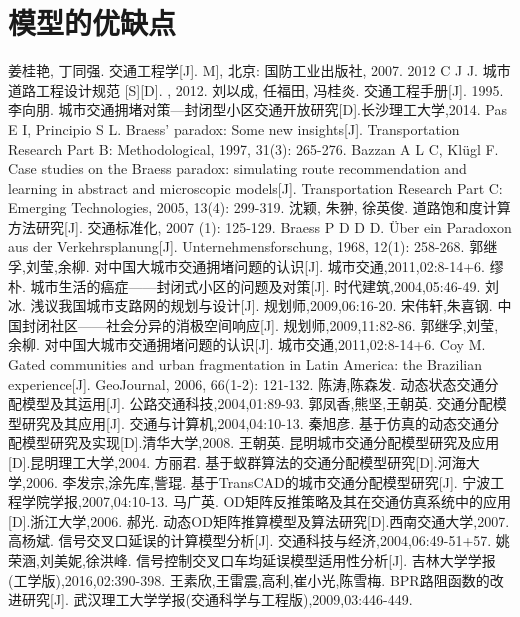 \documentclass{xcumcmart}
\begin{document}
\section{模型的优缺点}

\begin{thebibliography}{1}
 姜桂艳, 丁同强. 交通工程学[J]. M], 北京: 国防工业出版社, 2007.
 2012 C J J. 城市道路工程设计规范 [S][D]. , 2012.
 刘以成, 任福田, 冯桂炎. 交通工程手册[J]. 1995.
 李向朋. 城市交通拥堵对策—封闭型小区交通开放研究[D].长沙理工大学,2014.
Pas E I, Principio S L. Braess' paradox: Some new insights[J]. Transportation Research Part B: Methodological, 1997, 31(3): 265-276.
Bazzan A L C, Klügl F. Case studies on the Braess paradox: simulating route recommendation and learning in abstract and microscopic models[J]. Transportation Research Part C: Emerging Technologies, 2005, 13(4): 299-319.
 沈颖, 朱翀, 徐英俊. 道路饱和度计算方法研究[J]. 交通标准化, 2007 (1): 125-129.
 Braess P D D D. Über ein Paradoxon aus der Verkehrsplanung[J]. Unternehmensforschung, 1968, 12(1): 258-268.
郭继孚,刘莹,余柳. 对中国大城市交通拥堵问题的认识[J]. 城市交通,2011,02:8-14+6.
缪朴. 城市生活的癌症——封闭式小区的问题及对策[J]. 时代建筑,2004,05:46-49.
刘冰. 浅议我国城市支路网的规划与设计[J]. 规划师,2009,06:16-20.
宋伟轩,朱喜钢. 中国封闭社区——社会分异的消极空间响应[J]. 规划师,2009,11:82-86.
郭继孚,刘莹,余柳. 对中国大城市交通拥堵问题的认识[J]. 城市交通,2011,02:8-14+6.
Coy M. Gated communities and urban fragmentation in Latin America: the Brazilian experience[J]. GeoJournal, 2006, 66(1-2): 121-132.
陈涛,陈森发. 动态状态交通分配模型及其运用[J]. 公路交通科技,2004,01:89-93.
郭凤香,熊坚,王朝英. 交通分配模型研究及其应用[J]. 交通与计算机,2004,04:10-13.
秦旭彦. 基于仿真的动态交通分配模型研究及实现[D].清华大学,2008.
王朝英. 昆明城市交通分配模型研究及应用[D].昆明理工大学,2004.
方丽君. 基于蚁群算法的交通分配模型研究[D].河海大学,2006.
李发宗,涂先库,訾琨. 基于TransCAD的城市交通分配模型研究[J]. 宁波工程学院学报,2007,04:10-13.
马广英. OD矩阵反推策略及其在交通仿真系统中的应用[D].浙江大学,2006.
郝光. 动态OD矩阵推算模型及算法研究[D].西南交通大学,2007.
高杨斌. 信号交叉口延误的计算模型分析[J]. 交通科技与经济,2004,06:49-51+57.
姚荣涵,刘美妮,徐洪峰. 信号控制交叉口车均延误模型适用性分析[J]. 吉林大学学报(工学版),2016,02:390-398.
王素欣,王雷震,高利,崔小光,陈雪梅. BPR路阻函数的改进研究[J]. 武汉理工大学学报(交通科学与工程版),2009,03:446-449.

\end{thebibliography}
\end{document}
